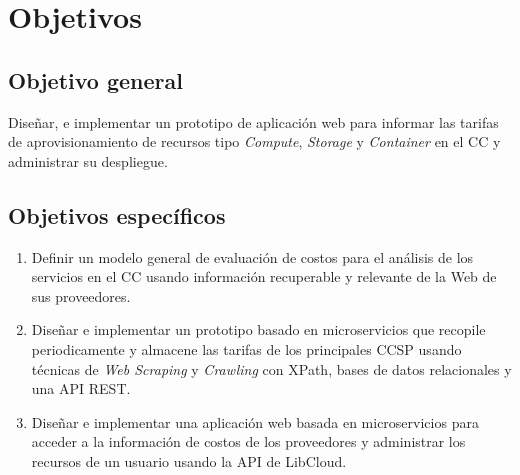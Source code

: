 \chapter{Objetivos} %

\label{ch:objetivos} %




\section{Objetivo general}
Diseñar, e implementar un prototipo de aplicación web para informar las tarifas de aprovisionamiento de recursos tipo \emph{Compute}, \emph{Storage} y \emph{Container} en el \acrshort{CC} y administrar su despliegue.\bigskip

\section{Objetivos específicos}
\begin{enumerate}
    \item Definir un modelo general de evaluación de costos para el análisis de los servicios en el \acrshort{CC} usando información recuperable y relevante de la Web de sus proveedores.
    
    \item Diseñar e implementar un prototipo basado en microservicios que recopile periodicamente y almacene las tarifas de los principales \acrshort{CCSP} usando técnicas de \emph{Web Scraping} y \emph{Crawling} con \gls{XPath}, bases de datos relacionales y una \acrshort{API REST}.
    
    \item Diseñar e implementar una aplicación web basada en microservicios para acceder a la información de costos de los proveedores y administrar los recursos de un usuario usando la \acrshort{API} de \gls{LibCloud}.
    
\end{enumerate}